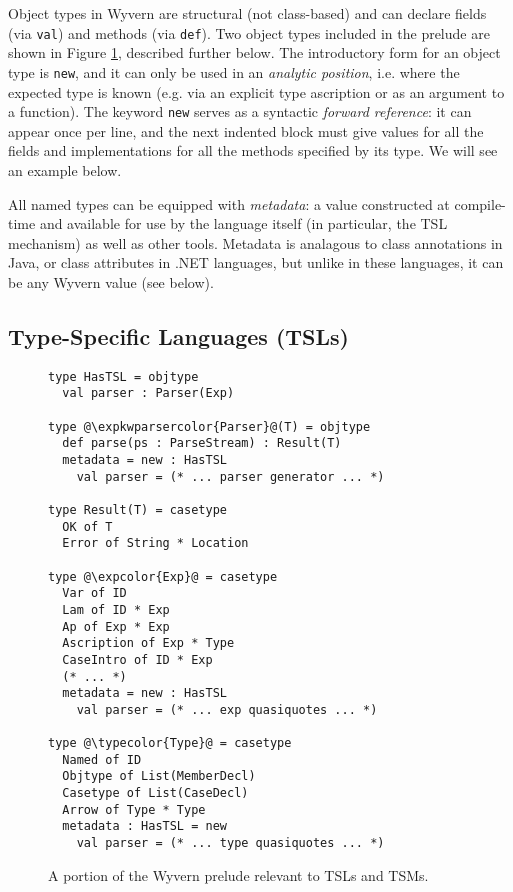 \documentclass{sig-alternate}
\newcommand{\expkwparsercolor}[1]{\textcolor[HTML]{336699}{#1}}
\newcommand{\expcolor}[1]{\textcolor[HTML]{FF0033}{#1}}
\newcommand{\typecolor}[1]{\textcolor[HTML]{660066}{#1}}
\newcommand{\mycaption}[1]{\vspace{-4px}\caption{#1}\vspace{-2px}}
\begin{document}
Object types in Wyvern are structural (not class-based) and can declare fields (via \texttt{val}) and methods (via \texttt{def}). Two object types included in the prelude are shown in Figure \ref{exp-prelude}, described further below. The introductory form for an object type is \verb|new|, and it can only be used in an \emph{analytic position}, i.e. where the expected type is known (e.g. via an explicit type ascription or as an argument to a function). The keyword \verb|new| serves as a syntactic \emph{forward reference}: it can appear once per line, and the next indented block must give values for all the fields and implementations for all the methods specified by its type. We will see an example below.


All named types can be equipped with \emph{metadata}: a value constructed at compile-time and available for use by the language itself (in particular, the TSL mechanism) as well as other tools. Metadata is analagous to class annotations in Java, or class attributes in .NET languages, but unlike in these languages, it can be any Wyvern value (see below). %

\subsection{Type-Specific Languages (TSLs)}


\begin{figure}[t!]
\begin{lstlisting}[style=wyvern]
type HasTSL = objtype
  val parser : Parser(Exp)

type @\expkwparsercolor{Parser}@(T) = objtype
  def parse(ps : ParseStream) : Result(T)
  metadata = new : HasTSL
    val parser = (* ... parser generator ... *)

type Result(T) = casetype
  OK of T
  Error of String * Location

type @\expcolor{Exp}@ = casetype
  Var of ID
  Lam of ID * Exp
  Ap of Exp * Exp
  Ascription of Exp * Type
  CaseIntro of ID * Exp
  (* ... *)
  metadata = new : HasTSL
    val parser = (* ... exp quasiquotes ... *)

type @\typecolor{Type}@ = casetype
  Named of ID
  Objtype of List(MemberDecl)
  Casetype of List(CaseDecl)
  Arrow of Type * Type
  metadata : HasTSL = new
    val parser = (* ... type quasiquotes ... *)
\end{lstlisting}
\mycaption{A portion of the Wyvern prelude relevant to TSLs and TSMs.}
\label{exp-prelude}
\end{figure}
\end{document}
